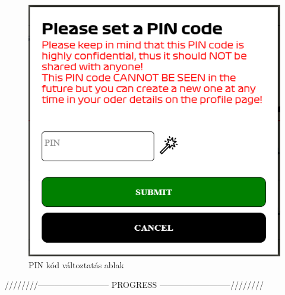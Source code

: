 \begin{figure}[!h]
	\centering
	\includegraphics[scale=0.4]{images/pinPopup}
	\caption{PIN kód változtatás ablak}
	\label{abra:pinPopup}
\end{figure}

\pagebreak




////////-------------------------- PROGRESS --------------------------////////

